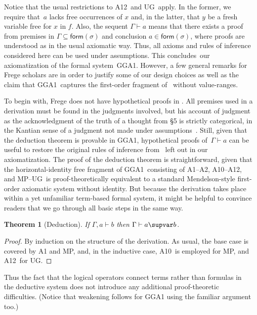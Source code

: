 \documentclass{preprint}
\newtheorem{theorem}{Theorem}[section]
\newcommand{\form}{\mathsf{form}}
\newcommand{\GGA}{\textsf{GGA1}}
\newcommand{\ia}{A1}%
\newcommand{\iia}{A2}%
\newcommand{\hypsyll}{A10}%
\newcommand{\fug}{A12}%
\renewcommand{\mp}{MP}%
\newcommand{\ug}{UG}%
\renewcommand{\to}{\supvar}
\begin{document}
Notice that the usual restrictions to \fug~and \ug~apply. In the former, we require that~$a$ lacks free occurrences of $x$ 
and, in the latter, that $y$ be a fresh variable free for $x$ in $f$. 
Also, the sequent $\Gamma \vdash a$ means that there exists a proof from premises in $\Gamma \subseteq \form(\sigma)$ and conclusion $a \in \form (\sigma)$, where proofs are understood as in the usual axiomatic way. 
Thus, all axioms and rules of inference considered here can be used under assumptions. This concludes~our axiomatization of the formal system~\GGA. However, 
a few general remarks for Frege scholars are in order to justify some of our design choices as well as the claim that \GGA~captures the first-order fragment of \gga~without value-ranges. 


To begin with, Frege does not have hypothetical proofs in \gga. 
All premises used in a derivation must be found in the judgments involved, but his account of judgment as the acknowledgment of the truth of a thought from \S5 is strictly categorical, in the Kantian sense of a judgment not made under assumptions~\cite[\S\S4--5]{bentzen2023fregett}. Still, given that the deduction theorem is provable in \GGA, hypothetical proofs of~$\Gamma \vdash a$ can be useful to restore the original rules of inference from \gga~left out in our axiomatization. 
The proof of the deduction theorem is straightforward, given that the horizontal-identity free fragment of \GGA~consisting of \ia--\iia, \hypsyll--\fug, and \mp--\ug~is proof-theoretically equivalent to a standard Mendelson-style first-order axiomatic system without identity. But because the derivation takes place within a yet unfamiliar term-based formal system, it might be helpful to convince readers that we go through all basic steps in the same way.

\begin{theorem}[Deduction]
	If $\Gamma, a \vdash b$ then $\Gamma \vdash a \to b$.
\end{theorem}
\begin{proof}
	By induction on the structure of the derivation. As usual, the base case is covered by {\ia} and \mp, and, in the inductive case, \hypsyll~is employed for \mp, and \fug~for \ug. 
\end{proof}

Thus the fact that the logical operators connect terms rather than formulas in the deductive system does not introduce any additional proof-theoretic difficulties. (Notice that weakening follows for {\GGA} using the familiar argument too.)
\end{document}
